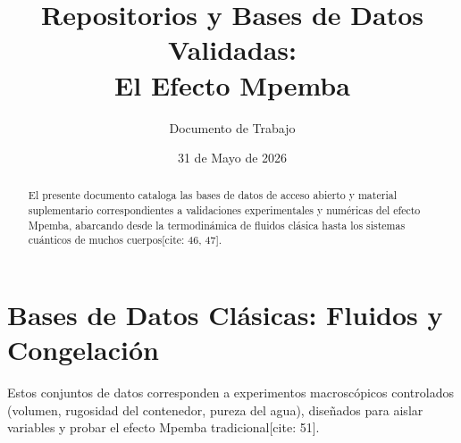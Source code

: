 \documentclass[11pt,a4paper]{article}
\title{\textbf{Repositorios y Bases de Datos Validadas:\\ El Efecto Mpemba}}
\author{Documento de Trabajo}
\date{31 de Mayo de 2026}
\begin{document}
\maketitle

\begin{abstract}
El presente documento cataloga las bases de datos de acceso abierto y material suplementario correspondientes a validaciones experimentales y numéricas del efecto Mpemba, abarcando desde la termodinámica de fluidos clásica hasta los sistemas cuánticos de muchos cuerpos[cite: 46, 47].
\end{abstract}

\section{Bases de Datos Clásicas: Fluidos y Congelación}
Estos conjuntos de datos corresponden a experimentos macroscópicos controlados (volumen, rugosidad del contenedor, pureza del agua), diseñados para aislar variables y probar el efecto Mpemba tradicional[cite: 51].
\end{document}
